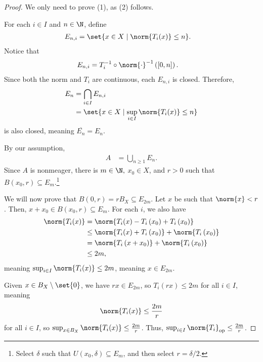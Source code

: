 \documentclass[10pt]{mypackage}
\begin{document}
  \begin{proof}
    We only need to prove (1), as (2) follows.\newline

    For each $i\in I$ and $n\in \N$, define
    \begin{align*}
      E_{n,i} &= \set{x\in X\mid \norm{T_i(x)} \leq n}.
    \end{align*}
    Notice that 
    \begin{align*}
      E_{n,i} &= T_i^{-1}\circ \norm{\cdot}^{-1}\left([0,n]\right).
    \end{align*}
    Since both the norm and $T_i$ are continuous, each $E_{n,i}$ is closed. Therefore,
    \begin{align*}
      E_{n} &= \bigcap_{i\in I}E_{n,i}\\
            &= \set{x\in X\mid \sup_{i\in I}\norm{T_i(x)} \leq n}
    \end{align*}
    is also closed, meaning $\overline{E_n} = E_n$.\newline

    By our assumption,
    \begin{align*}
      A &= \bigcup_{n\geq 1}E_n.
    \end{align*}
    Since $A$ is nonmeager, there is $m\in \N,$  $x_0\in X$, and $r > 0$ such that $B\left(x_0,r\right)\subseteq E_m$.\footnote{Select $\delta$ such that $U\left(x_0,\delta\right)\subseteq E_m$, and then select $r = \delta/2$.}\newline

    We will now prove that $B\left(0,r\right) = rB_{X}\subseteq E_{2m}$. Let $x$ be such that $\norm{x} < r$. Then, $x + x_0\in B\left(x_0,r\right) \subseteq E_m$. For each $i$, we also have
    \begin{align*}
      \norm{T_i(x)} &= \norm{T_i(x) - T_i\left(x_0\right) + T_i\left(x_0\right)}\\
                    &\leq \norm{T_i(x) + T_i\left(x_0\right)} + \norm{T_i\left(x_0\right)}\\
                    &= \norm{T_i\left(x + x_0\right)} + \norm{T_i\left(x_0\right)}\\
                    &\leq 2m,
    \end{align*}
    meaning $\sup_{i\in I}\norm{T_i(x)} \leq 2m$, meaning $x\in E_{2m}$.\newline

    Given $x\in B_X \setminus \set{0}$, we have $rx\in E_{2m}$, so $T_i\left(rx\right) \leq 2m$ for all $i\in I$, meaning
    \begin{align*}
      \norm{T_i(x)} \leq \frac{2m}{r}
    \end{align*}
    for all $i\in I$, so $\sup_{x\in B_X}\norm{T_i(x)}\leq \frac{2m}{r}$. Thus, $\sup_{i\in I}\norm{T_i}_{\text{op}} \leq \frac{2m}{r}$.
  \end{proof}
\end{document}
